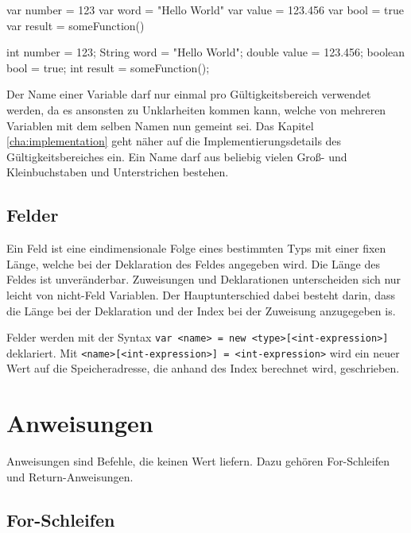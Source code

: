 \begin{ToyaCode}[numbers=none, caption={Variablendeklaration in toya}, label=lst:intro_varinittoya]
var number = 123
var word = "Hello World"
var value = 123.456
var bool = true
var result = someFunction()
\end{ToyaCode}

\begin{JavaCode}[numbers=none,caption={Variablendeklaration in Java (vor Version 10)}, label=lst:intro_varinitjava]
int number = 123;
String word = "Hello World";
double value = 123.456;
boolean bool = true;
int result = someFunction();
\end{JavaCode}

Der Name einer Variable darf nur einmal pro Gültigkeitsbereich verwendet werden, da es ansonsten zu Unklarheiten kommen kann, welche von mehreren Variablen mit dem selben Namen nun gemeint sei. Das Kapitel \ref{cha:implementation} geht näher auf die Implementierungsdetails des Gültigkeitsbereiches ein. Ein Name darf aus beliebig vielen Groß- und Kleinbuchstaben und Unterstrichen bestehen.

\subsection{Felder}

Ein Feld ist eine eindimensionale Folge eines bestimmten Typs mit einer fixen Länge, welche bei der Deklaration des Feldes angegeben wird. Die Länge des Feldes ist unveränderbar. Zuweisungen und Deklarationen unterscheiden sich nur leicht von nicht-Feld Variablen. Der Hauptunterschied dabei besteht darin, dass die Länge bei der Deklaration und der Index bei der Zuweisung anzugegeben is.

Felder werden mit der Syntax \texttt{var <name> = new <type>[<int-expression>]} deklariert. Mit \texttt{<name>[<int-expression>] = <int-expression>} wird ein neuer Wert auf die Speicheradresse, die anhand des Index berechnet wird, geschrieben.

\section{Anweisungen}

Anweisungen sind Befehle, die keinen Wert liefern. Dazu gehören For-Schleifen und Return-Anweisungen.

\subsection{For-Schleifen}

